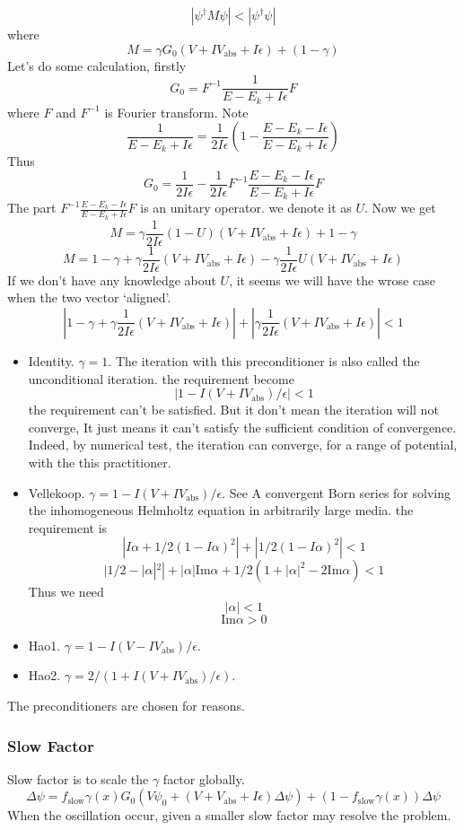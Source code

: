 \documentclass[12pt,twoside]{article}
\begin{document}
$$
\left|\psi^\dagger M\psi\right| < |\psi^\dagger\psi|
$$
where
$$
M = \gamma G_0 (V+IV_\text{abs}+I\epsilon) + (1-\gamma)
$$
Let's do some calculation, firstly
$$
G_0 = F^{-1} \frac{1}{E-E_k+I\epsilon} F
$$
where $F$ and $F^{-1}$ is Fourier transform. Note
$$
\frac{1}{E-E_k+I\epsilon} =\frac{1}{2I\epsilon}\left( 1- \frac{E-E_k-I\epsilon}{E-E_k+I\epsilon}\right)
$$
Thus
$$
G_0 = \frac{1}{2I\epsilon} - \frac{1}{2I\epsilon}F^{-1}  \frac{E-E_k-I\epsilon}{E-E_k+I\epsilon} F
$$
The part
 $F^{-1}  \frac{E-E_k-I\epsilon}{E-E_k+I\epsilon} F$ is an unitary operator. we denote it as $U$.
Now we get
$$
M = \gamma  \frac{1}{2I\epsilon} (1 - U) (V + IV_\text{abs} + I\epsilon) + 1 -\gamma
$$
$$
M = 1 -\gamma + \gamma  \frac{1}{2I\epsilon} (V + IV_\text{abs} + I\epsilon)  - \gamma  \frac{1}{2I\epsilon} U (V + IV_\text{abs} + I\epsilon)
$$
If we don't have any knowledge about $U$, it seems we will have the wrose case when the two vector `aligned'.
$$
|1 -\gamma + \gamma  \frac{1}{2I\epsilon} (V + IV_\text{abs} + I\epsilon)| + |\gamma  \frac{1}{2I\epsilon} (V + IV_\text{abs} + I\epsilon)| < 1
$$


\begin{itemize}
  \item Identity. $\gamma=1$. The iteration with this preconditioner is also called the unconditional iteration.
  the requirement become
$$
\left| 1 - I(V + IV_\text{abs})/\epsilon\right| < 1
$$
the requirement can't be satisfied. But it don't mean the iteration will not converge, It just means it can't satisfy the sufficient condition of convergence. Indeed, by numerical test, the iteration can converge, for a range of potential, with the this practitioner.

  \item Vellekoop. $\gamma=1 - I (V+IV_\text{abs}) /\epsilon$. See A convergent Born series for solving the inhomogeneous Helmholtz equation in arbitrarily large media. the requirement is
      $$
      |I\alpha + 1/2(1-I\alpha)^2|+|1/2(1-I\alpha)^2| < 1
      $$
      $$
        |1/2 - |\alpha|^2| + |\alpha|\text{Im}\alpha + 1/2(1+|\alpha|^2-2\text{Im}\alpha)<1
      $$
      Thus we need
      $$
      |\alpha| < 1
      $$
      $$
      \text{Im}\alpha > 0
      $$
 \item Hao1. $\gamma=1 - I (V-IV_\text{abs}) /\epsilon$.
  \item Hao2. $\gamma=2/(1 + I (V+IV_\text{abs}) / \epsilon)$.
\end{itemize}
The preconditioners are chosen for reasons.

\subsubsection{Slow Factor}
Slow factor is to scale the $\gamma$ factor globally.
$$\Delta\psi = f_\text{slow} \gamma(x) G_0(V\psi_0 + (V+V_\text{abs} + I\epsilon)\Delta \psi) + (1- f_\text{slow}\gamma(x))\Delta \psi$$
When the oscillation occur, given a smaller slow factor may resolve the problem.
\end{document}
